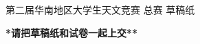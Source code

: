 \documentclass[CJK]{article}
\begin{document}
\bch
\bcenter

第二届华南地区大学生天文竞赛 总赛 草稿纸

{\bf **请把草稿纸和试卷一起上交**}
\ecenter


\ech
\end{document}
